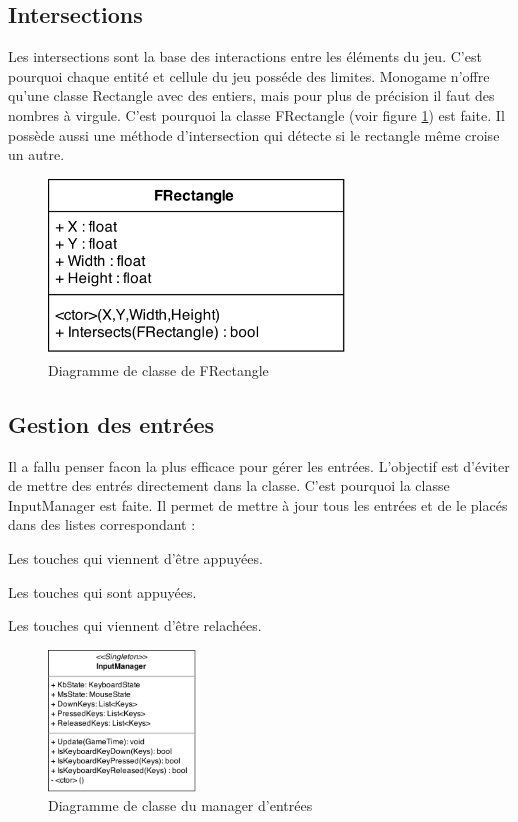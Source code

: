\documentclass[11pt, a4paper, oneside]{report}
\begin{document}
\subsection{Intersections}
Les intersections sont la base des interactions entre les éléments du jeu. C'est pourquoi chaque entité et cellule du jeu posséde des limites. Monogame n'offre qu'une classe Rectangle avec des entiers, mais pour plus de précision il faut des nombres à virgule. C'est pourquoi la classe FRectangle (voir figure \ref{fig:FRectangle}) est faite. Il possède aussi une méthode d'intersection qui détecte si le rectangle même croise un autre.
\begin{figure}[h]
	\begin{center}
	\includegraphics[width=0.7\textwidth]{FRectangle}
	\caption{Diagramme de classe de FRectangle}
	\label{fig:FRectangle}
	\end{center}
\end{figure}
\label{subsec:intersections}
\subsection{Gestion des entrées}
Il a fallu penser facon la plus efficace pour gérer les entrées. L'objectif est d'éviter de mettre des entrés directement dans la classe. C'est pourquoi la classe InputManager est faite.  Il permet de mettre à jour tous les entrées et de le placés dans des listes correspondant :

\begin{description}[labelindent=0.5cm]
	\item[DownKeys] Les touches qui viennent d'être appuyées.
	\item[PressedKeys] Les touches qui sont appuyées.
	\item[ReleasedKeys] Les touches qui viennent d'être relachées.
\end{description}

\begin{figure}[h]
	\begin{center}
	\includegraphics[width=0.35\textwidth]{InputManager}
	\caption{Diagramme de classe du manager d'entrées}
	\label{fig:InputManager}
	\end{center}
\end{figure}
\end{document}

